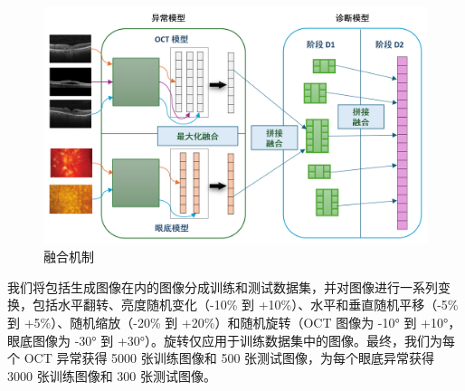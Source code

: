 \documentclass{article}
\begin{document}
	\vspace{0.2cm}

	\begin{figure}[htbp]
	\centering
	\includegraphics[width=\linewidth]{Figs/fusion.png}
	\caption{融合机制}
	\vspace{0.3cm}
	\label{fig:fusion}
	\end{figure}
	
	\pagebreak
	
	\begin{multicols}{2}
	我们将包括生成图像在内的图像分成训练和测试数据集，并对图像进行一系列变换，包括水平翻转、亮度随机变化（-10\% 到 +10\%）、水平和垂直随机平移（-5\% 到 +5\%）、随机缩放（-20\% 到 +20\%）和随机旋转（OCT 图像为 -10° 到 +10°，眼底图像为 -30° 到 +30°）。旋转仅应用于训练数据集中的图像。最终，我们为每个 OCT 异常获得 5000 张训练图像和 500 张测试图像，为每个眼底异常获得 3000 张训练图像和 300 张测试图像。
	\end{multicols}
		
	
		
\end{document}
